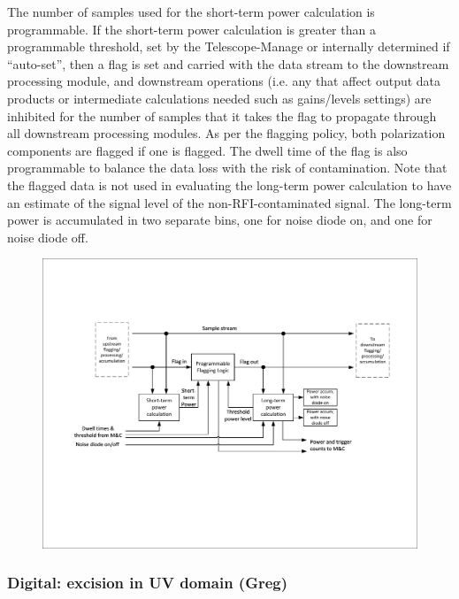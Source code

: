 The number of samples used for the short-term power calculation is programmable. If the short-term power calculation is greater than a programmable threshold, set by the Telescope-Manage or internally determined if “auto-set”, then a flag is set and carried with the data stream to the downstream processing module, and downstream operations (i.e. any that affect output data products or intermediate calculations needed such as gains/levels settings) are inhibited for the number of samples that it takes the flag to propagate through all downstream processing modules. As per the flagging policy, both polarization components are flagged if one is flagged. The dwell time of the flag is also programmable to balance the data loss with the risk of contamination. Note that the flagged data is not used in evaluating the long-term power calculation to have an estimate of the signal level of the non-RFI-contaminated signal. The long-term power is accumulated in two separate bins, one for noise diode on, and one for noise diode off.

\begin{figure}
    \centering
    \includegraphics[height=.28\textheight]{figures/RFI_DF_SKA_Mid_CBF.pdf}
    \caption{}
    \label{fig:rfi_df_ska_mid_cbf}
\end{figure}


\subsubsection{Digital: excision in UV domain (Greg)}

